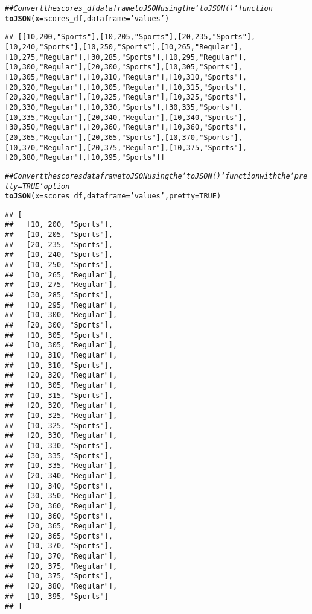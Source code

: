 \documentclass{article}\usepackage[]{graphicx}\usepackage[]{xcolor}
\makeatletter
\newcommand{\hlnum}[1]{\textcolor[rgb]{0.686,0.059,0.569}{#1}}%
\newcommand{\hlstr}[1]{\textcolor[rgb]{0.192,0.494,0.8}{#1}}%
\newcommand{\hlcom}[1]{\textcolor[rgb]{0.678,0.584,0.686}{\textit{#1}}}%
\newcommand{\hlstd}[1]{\textcolor[rgb]{0.345,0.345,0.345}{#1}}%
\newcommand{\hlkwc}[1]{\textcolor[rgb]{0.333,0.667,0.333}{#1}}%
\newcommand{\hlkwd}[1]{\textcolor[rgb]{0.737,0.353,0.396}{\textbf{#1}}}%
\newenvironment{kframe}{%
 \def\at@end@of@kframe{}%
 \ifinner\ifhmode%
  \def\at@end@of@kframe{\end{minipage}}%
  \begin{minipage}{\columnwidth}%
 \fi\fi%
 \def\FrameCommand##1{\hskip\@totalleftmargin \hskip-\fboxsep
 \colorbox{shadecolor}{##1}\hskip-\fboxsep
     \hskip-\linewidth \hskip-\@totalleftmargin \hskip\columnwidth}%
 \MakeFramed {\advance\hsize-\width
   \@totalleftmargin\z@ \linewidth\hsize
   \@setminipage}}%
 {\par\unskip\endMakeFramed%
 \at@end@of@kframe}
\newenvironment{knitrout}{}{} %
\makeatother
\begin{document}
\begin{knitrout}
\begin{kframe}
\begin{alltt}
\hlcom{## Convert the scores_df dataframe to JSON using the `toJSON()` function}
\hlkwd{toJSON}\hlstd{(}\hlkwc{x} \hlstd{= scores_df,} \hlkwc{dataframe} \hlstd{=} \hlstr{'values'}\hlstd{)}
\end{alltt}
\begin{verbatim}
## [[10,200,"Sports"],[10,205,"Sports"],[20,235,"Sports"],[10,240,"Sports"],[10,250,"Sports"],[10,265,"Regular"],[10,275,"Regular"],[30,285,"Sports"],[10,295,"Regular"],[10,300,"Regular"],[20,300,"Sports"],[10,305,"Sports"],[10,305,"Regular"],[10,310,"Regular"],[10,310,"Sports"],[20,320,"Regular"],[10,305,"Regular"],[10,315,"Sports"],[20,320,"Regular"],[10,325,"Regular"],[10,325,"Sports"],[20,330,"Regular"],[10,330,"Sports"],[30,335,"Sports"],[10,335,"Regular"],[20,340,"Regular"],[10,340,"Sports"],[30,350,"Regular"],[20,360,"Regular"],[10,360,"Sports"],[20,365,"Regular"],[20,365,"Sports"],[10,370,"Sports"],[10,370,"Regular"],[20,375,"Regular"],[10,375,"Sports"],[20,380,"Regular"],[10,395,"Sports"]]
\end{verbatim}
\begin{alltt}
\hlcom{## Convert the scores dataframe to JSON using the `toJSON()` function with the `pretty=TRUE` option}
\hlkwd{toJSON}\hlstd{(}\hlkwc{x} \hlstd{= scores_df,} \hlkwc{dataframe} \hlstd{=} \hlstr{'values'}\hlstd{,} \hlkwc{pretty} \hlstd{=} \hlnum{TRUE}\hlstd{)}
\end{alltt}
\begin{verbatim}
## [
##   [10, 200, "Sports"],
##   [10, 205, "Sports"],
##   [20, 235, "Sports"],
##   [10, 240, "Sports"],
##   [10, 250, "Sports"],
##   [10, 265, "Regular"],
##   [10, 275, "Regular"],
##   [30, 285, "Sports"],
##   [10, 295, "Regular"],
##   [10, 300, "Regular"],
##   [20, 300, "Sports"],
##   [10, 305, "Sports"],
##   [10, 305, "Regular"],
##   [10, 310, "Regular"],
##   [10, 310, "Sports"],
##   [20, 320, "Regular"],
##   [10, 305, "Regular"],
##   [10, 315, "Sports"],
##   [20, 320, "Regular"],
##   [10, 325, "Regular"],
##   [10, 325, "Sports"],
##   [20, 330, "Regular"],
##   [10, 330, "Sports"],
##   [30, 335, "Sports"],
##   [10, 335, "Regular"],
##   [20, 340, "Regular"],
##   [10, 340, "Sports"],
##   [30, 350, "Regular"],
##   [20, 360, "Regular"],
##   [10, 360, "Sports"],
##   [20, 365, "Regular"],
##   [20, 365, "Sports"],
##   [10, 370, "Sports"],
##   [10, 370, "Regular"],
##   [20, 375, "Regular"],
##   [10, 375, "Sports"],
##   [20, 380, "Regular"],
##   [10, 395, "Sports"]
## ]
\end{verbatim}
\end{kframe}
\end{knitrout}
\end{document}

